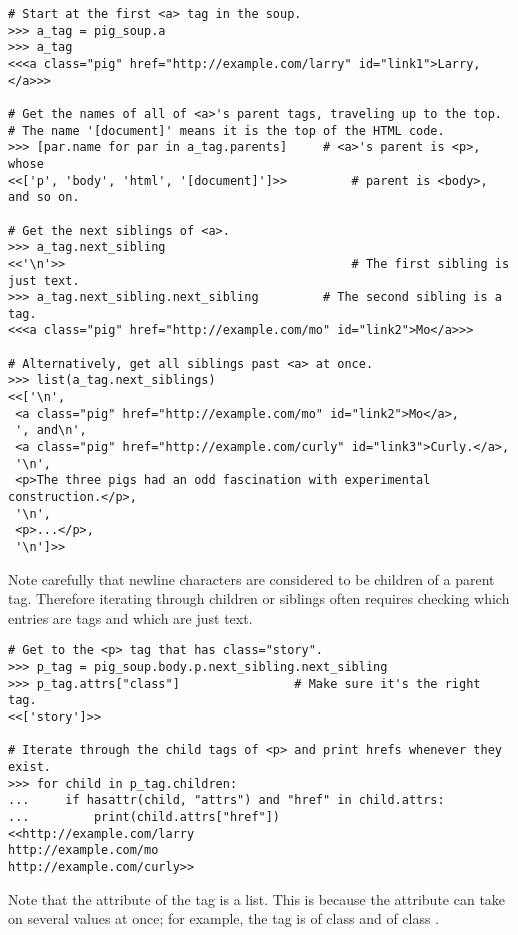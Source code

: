 \begin{lstlisting}
# Start at the first <a> tag in the soup.
>>> a_tag = pig_soup.a
>>> a_tag
<<<a class="pig" href="http://example.com/larry" id="link1">Larry,</a>>>

# Get the names of all of <a>'s parent tags, traveling up to the top.
# The name '[document]' means it is the top of the HTML code.
>>> [par.name for par in a_tag.parents]     # <a>'s parent is <p>, whose
<<['p', 'body', 'html', '[document]']>>         # parent is <body>, and so on.

# Get the next siblings of <a>.
>>> a_tag.next_sibling
<<'\n'>>                                        # The first sibling is just text.
>>> a_tag.next_sibling.next_sibling         # The second sibling is a tag.
<<<a class="pig" href="http://example.com/mo" id="link2">Mo</a>>>

# Alternatively, get all siblings past <a> at once.
>>> list(a_tag.next_siblings)
<<['\n',
 <a class="pig" href="http://example.com/mo" id="link2">Mo</a>,
 ', and\n',
 <a class="pig" href="http://example.com/curly" id="link3">Curly.</a>,
 '\n',
 <p>The three pigs had an odd fascination with experimental construction.</p>,
 '\n',
 <p>...</p>,
 '\n']>>
\end{lstlisting}

Note carefully that newline characters are considered to be children of a parent tag.
Therefore iterating through children or siblings often requires checking which entries are tags and which are just text.

\begin{lstlisting}
# Get to the <p> tag that has class="story".
>>> p_tag = pig_soup.body.p.next_sibling.next_sibling
>>> p_tag.attrs["class"]                # Make sure it's the right tag.
<<['story']>>

# Iterate through the child tags of <p> and print hrefs whenever they exist.
>>> for child in p_tag.children:
...     if hasattr(child, "attrs") and "href" in child.attrs:
...         print(child.attrs["href"])
<<http://example.com/larry
http://example.com/mo
http://example.com/curly>>
\end{lstlisting}

Note that the  attribute of the  tag is a list.
This is because the  attribute can take on several values at once; for example, the tag  is of class  and of class .

